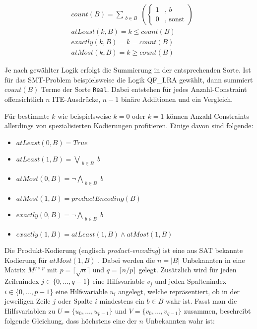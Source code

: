 \[
    \begin{aligned}
        & count(B) = \sum_{\substack{b \in B}}
            \left(
                \begin{cases}
                    1 & \text{, } b \\
                    0 & \text{, sonst}
                \end{cases}
            \right) \\[5pt]
        & atLeast(k, B) = k \leq count(B) \\[5pt]
        & exactly(k, B) = k = count(B) \\[5pt]
        & atMost(k, B) = k \geq count(B)
    \end{aligned}
\]

Je nach gewählter Logik erfolgt die Summierung in der entsprechenden Sorte.
Ist für das SMT-Problem beispielsweise die Logik QF\_LRA gewählt, dann summiert $count(B)$ Terme der Sorte \texttt{Real}.
Dabei entstehen für jedes Anzahl-Constraint offensichtlich $n$ ITE-Ausdrücke, $n-1$ binäre Additionen und ein Vergleich.

Für bestimmte $k$ wie beispielsweise $k = 0$ oder $k = 1$ können Anzahl-Constraints allerdings von spezialisierten Kodierungen profitieren.
Einige davon sind folgende:
\begin{itemize}
    \item $atLeast(0,B) = True$
    \item $atLeast(1,B) = \bigvee\limits_{\substack{b \in B}} b $
    \item $atMost(0,B) = \neg\bigwedge\limits_{\substack{b \in B}} b$
    \item $atMost(1,B) = productEncoding(B)$
    \item $exactly(0,B) = \neg\bigwedge\limits_{\substack{b \in B}} b$
    \item $exactly(1,B) = atLeast(1,B) \land atMost(1,B)$
\end{itemize}

Die Produkt-Kodierung (englisch \textit{product-encoding}) ist eine aus SAT bekannte Kodierung für $atMost(1,B)$ \cite{amoChen}.
Dabei werden die $n = \lvert B \rvert$ Unbekannten in eine Matrix $M^{q \times p}$ mit $p = \lceil \sqrt {n} \rceil$ und $q = \lceil n/p \rceil$ gelegt.
Zusätzlich wird für jeden Zeilenindex $j \in \{0,\ldots,q-1\}$ eine Hilfsvariable $v_j$ und jeden Spaltenindex $i \in \{0,\ldots,p-1\}$ eine Hilfsvariable $u_i$ angelegt,
welche repräsentiert, ob in der jeweiligen Zeile $j$ oder Spalte $i$ mindestens ein $b \in B$ wahr ist.
Fasst man die Hilfsvariablen zu $U = \{ u_0,\ldots, u_{p-1} \}$ und $V = \{ v_0,\ldots, v_{q-1} \}$ zusammen, beschreibt folgende Gleichung,
dass höchstens eine der $n$ Unbekannten wahr ist:

